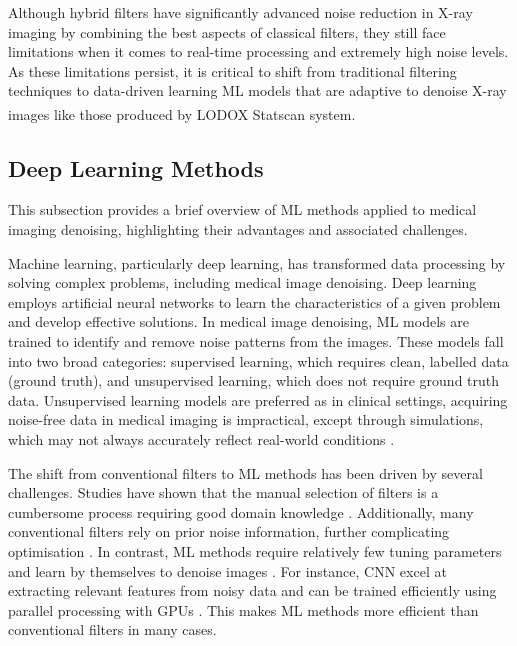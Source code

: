 Although hybrid filters have significantly advanced noise reduction in X-ray imaging by combining the best aspects of classical filters, they still face limitations when it comes to real-time processing and extremely high noise levels. As these limitations persist, it is critical to shift from traditional filtering techniques to data-driven learning \gls{ML} models that are adaptive to denoise X-ray images like those produced by  LODOX\textsuperscript{\textregistered} Statscan\textsuperscript{\textregistered} system.


\subsection{Deep Learning Methods}
\label{sec:deeplearning}
This subsection provides a brief overview of  \gls{ML} methods applied to medical imaging denoising, highlighting their advantages and associated challenges.


Machine learning, particularly deep learning, has transformed data processing by solving complex problems, including medical image denoising. Deep learning employs artificial neural networks to learn the characteristics of a given problem and develop effective solutions. In medical image denoising, ML models are trained to identify and remove noise patterns from the images. These models fall into two broad categories: supervised learning, which requires clean, labelled data (ground truth), and unsupervised learning, which does not require ground truth data. Unsupervised learning models are preferred as in clinical settings, acquiring noise-free data in medical imaging is impractical, except through simulations, which may not always accurately reflect real-world conditions \cite{hariharan_learning-based_2019}.

The shift from conventional filters to \gls{ML} methods has been driven by several challenges. Studies have shown that the manual selection of filters is a cumbersome process requiring good domain knowledge \cite{juneja_denoising_2024}.  Additionally, many conventional filters rely on prior noise information, further complicating optimisation \cite{juneja_denoising_2024}. In contrast, ML methods require relatively few tuning parameters and learn by themselves to denoise images \cite{nadkarni_deep_2023}. For instance,  \gls{CNN} excel at extracting relevant features from noisy data and can be trained efficiently using parallel processing with \gls{GPU}s \cite{juneja_denoising_2024}. This makes \gls{ML} methods more efficient than conventional filters in many cases.

